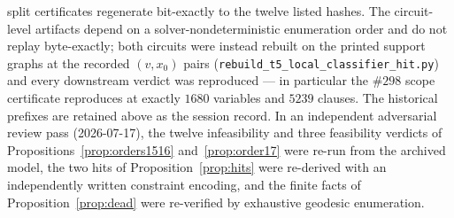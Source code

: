 \begin{table}[ht]
{split certificates regenerate bit-exactly to the twelve listed hashes.
The circuit-level artifacts depend on a solver-nondeterministic
enumeration order and do not replay byte-exactly; both circuits were
instead rebuilt on the printed support graphs at the recorded
\((v,x_0)\) pairs (\texttt{rebuild\_t5\_local\_classifier\_hit.py})
and every downstream verdict was reproduced --- in particular the
\(\#298\) scope certificate reproduces at exactly \(1680\) variables
and \(5239\) clauses. The historical prefixes are retained above as
the session record. In an independent adversarial
review pass (2026-07-17), the twelve infeasibility and three
feasibility verdicts of
Propositions~\ref{prop:orders1516} and~\ref{prop:order17} were re-run
from the archived model, the two hits of Proposition~\ref{prop:hits}
were re-derived with an independently written constraint encoding, and
the finite facts of Proposition~\ref{prop:dead} were re-verified by
exhaustive geodesic enumeration.}
\label{tab:t5artifacts}
\end{table}
